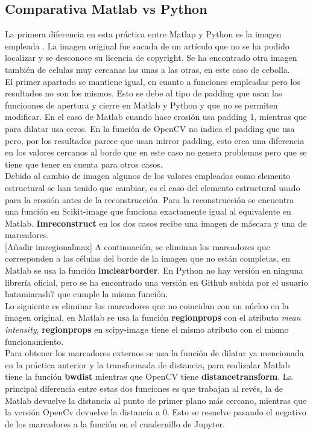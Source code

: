 \documentclass[a4paper,12pt]{report}
\begin{document}
\subsection{Comparativa Matlab vs Python}

La primera diferencia en esta práctica entre Matlap y Python es la imagen empleada . La imagen original fue sacada de un artículo que no se ha podido localizar y se desconoce su licencia de copyright. Se ha encontrado otra imagen también de celulas muy cercanas las unas a las otras, en este caso de cebolla.\\

El primer apartado se mantiene igual, en cuanto a funciones empleadas pero los resultados no son los mismos. Esto se debe al tipo de padding que usan las funcioones de apertura y cierre en Matlab y Python y que no se permiten modificar. En el caso de Matlab cuando hace erosión usa padding 1, mientras que para dilatar usa ceros. En la función de OpenCV no indica el padding que usa pero, por los resultados parece que usan mirror padding, esto crea una diferencia en los valores cercanos al borde que en este caso no genera problemas pero que se tiene que tener en cuenta para otros casos.\\

Debido al cambio de imagen algunos de los valores empleados como elemento estructural se han tenido que cambiar, es el caso del elemento estructural usado para la erosión antes de la reconstrucción. Para la reconstrucción se encuentra una función en Scikit-image que funciona exactamente igual al equivalente en Matlab. \textbf{Imreconstruct} en los dos casos recibe una imagen de máscara y una de marcadores.\\

[Añadir imregionalmax]
A continuación, se eliminan los marcadores que corresponden a las células del borde de la imagen que no están completas, en Matlab se usa la función \textbf{imclearborder}. En Python no hay versión en ninguna librería oficial, pero se ha encontrado una versión en Github subida por el usuario hatamiarash7 que cumple la misma función.\\

Lo siguiente es eliminar los marcadores que no coincidan con un núcleo en la imagen original, en Matlab se usa la función\textbf{ regionprops} con el atributo \emph{mean intensity}, \textbf{regionprops} en scipy-image tiene el mismo atributo con el mismo funcionamiento.\\

Para obtener los marcadores externos se usa la función de dilatar ya mencionada en la práctica anterior y la transformada de distancia, para realizalar Matlab tiene la función \textbf{bwdist} mientras que OpenCV tiene \textbf{distancetransform}. La principal diferencia entre estas dos funciones es que trabajan al revés, la de Matlab devuelve la distancia al punto de primer plano más cercano, mientras que la versión OpenCv devuelve la distancia a 0. Esto se resuelve pasando el negativo de los marcadores a la función en el cuadernillo de Jupyter.\\
\end{document}

